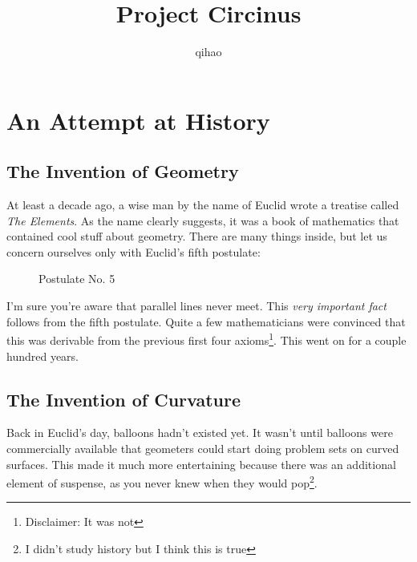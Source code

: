 \documentclass{article}
\title{Project Circinus}
\author{qihao}
\date{}
\begin{document}
\maketitle

\section{An Attempt at History}
\subsection{The Invention of Geometry}
At least a decade ago, a wise man by the name of Euclid wrote a treatise called \textit{The Elements}. As the name clearly suggests, it was a book of mathematics that contained cool stuff about geometry. There are many things inside, but let us concern ourselves only with Euclid's fifth postulate:

\begin{figure}[h]
    \centering
    \caption{Postulate No. 5}
\end{figure}


I'm sure you're aware that parallel lines never meet. This \textit{very important fact} follows from the fifth postulate. Quite a few mathematicians were convinced that this was derivable from the previous first four axioms\footnote{Disclaimer: It was not}. This went on for a couple hundred years.

\subsection{The Invention of Curvature}
Back in Euclid's day, balloons hadn't existed yet. It wasn't until balloons were commercially available that geometers could start doing problem sets on curved surfaces. This made it much more entertaining because there was an additional element of suspense, as you never knew when they would pop\footnote{I didn't study history but I think this is true}.
\end{document}
